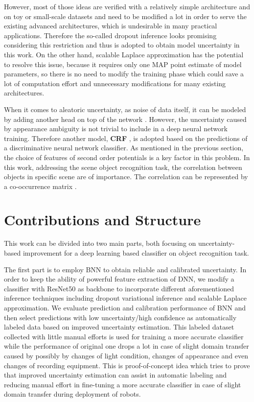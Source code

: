 However, most of those ideas are verified with a relatively simple architecture and on toy or small-scale datasets and need to be modified a lot in order to serve the existing advanced architectures, which is undesirable in many practical applications. Therefore the so-called dropout inference\cite{gal2016dropout} looks promising considering this restriction and thus is adopted to obtain model uncertainty in this work. On the other hand, scalable Laplace approximation \cite{ritter2018scalable} has the potential to resolve this issue, because it requires only one MAP point estimate of model parameters, so there is no need to modify the training phase which could save a lot of computation effort and unnecessary modifications for many existing architectures.

When it comes to aleatoric uncertainty, as noise of data itself, it can be modeled by adding another head on top of the network \cite{kendall2017uncertainties}. However, the uncertainty caused by appearance ambiguity is not trivial to include in a deep neural network training. Therefore another model, \textbf{CRF}
\cite{lafferty2001conditional}, is adopted based on the predictions of a discriminative neural network classifier. As mentioned in the previous section, the choice of features of second order potentials is a key factor in this problem. In this work, addressing the scene object recognition task, the correlation between objects in specific scene are of importance. The correlation can be represented by a co-occurrence matrix \cite{ladicky2010graph}\cite{rasiwasia2009holistic}\cite{galleguillos2008object}\cite{rabinovich2007objects}.

\section{Contributions and Structure}
This work can be divided into two main parts, both focusing on uncertainty-based improvement for a deep learning based classifier on object recognition task. 

The first part is to employ BNN to obtain reliable and calibrated uncertainty. In order to keep the ability of powerful feature extraction of DNN, we modify a classifier with ResNet50\cite{he2016deep} as backbone to incorporate different aforementioned inference techniques including dropout variational inference and scalable Laplace approximation. We evaluate prediction and calibration performance of BNN and then select predictions with low uncertainty/high confidence as automatically labeled data based on improved uncertainty estimation. This labeled dataset collected with little manual efforts is used for training a more accurate classifier while the performance of original one drops a lot in case of slight domain transfer caused by possibly by changes of light condition, changes of appearance and even changes of recording equipment. This is proof-of-concept idea which tries to prove that improved uncertainty estimation can assist in automatic labeling and reducing manual effort in fine-tuning a more accurate classifier in case of slight domain transfer during deployment of robots. 


